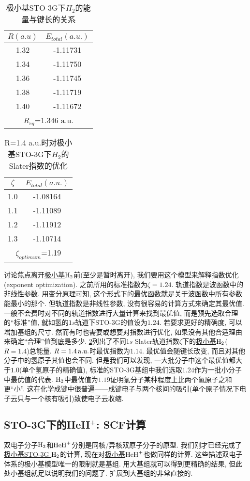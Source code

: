 \begin{table}[H]
	\centering
	\caption{极小基STO-3G下$H_2$的能量与键长的关系}
	\begin{tabular}{cc}
		\hline
		$R(a.u)$ & $E_{total}(a.u.)$\\\hline
		1.32      & -1.11731\\
		1.34     & -1.11750\\
		1.36     & -1.11745\\
		1.38     & -1.11719\\
		1.40     & -1.11672\\\hline
		\multicolumn{2}{c}{$R_{eq}$=1.346 a.u.}
	\end{tabular}
	\label{t3.2}
\end{table}
\begin{table}[H]
	\centering
	\caption{R=1.4 a.u.时对极小基STO-3G下$H_2$的Slater指数的优化}
	\begin{tabular}{cc}
		\hline
		$\zeta$ & $E_{total}(a.u.)$\\\hline
		1.0      & -1.08164\\
		1.1     & -1.11089\\
		1.2     & -1.11912\\
		1.3     & -1.10714\\\hline
		\multicolumn{2}{c}{$\zeta_{optimum}$=1.19}
	\end{tabular}
	\label{t3.3}
\end{table}
讨论焦点离开\underline{极小基$\mathrm{H}_2$}前(至少是暂时离开), 
我们要用这个模型来解释指数优化(exponent optimization). 
之前所用的标准指数为$\zeta=1.24$. 
轨道指数是波函数中的非线性参数. 
用变分原理可知, 
这个形式下的最优函数就是关于波函数中所有参数能最小的那个. 
但轨道指数是非线性参数, 
没有很容易的计算方式来确定其最优值. 
一般不会费时对不同的轨道指数进行大量计算来找到最优值, 
而是预先选取合理的``标准''值, 
就如氢的$1s$轨道下STO-3G的值设为$1.24$. 
若要求更好的精确度, 
可以增加基组的尺寸. 
然而有时也需要或想要对指数进行优化, 
如果没有其他合适理由来确定``合理''值到底是多少. 
\ref{t3.3}列出了不同$1s$ Slater轨道指数$\zeta$下的\underline{极小基$\mathrm{H}_2$}($R=1.4$)总能量. 
$R=1.4\,\mathrm{a.u.}$时最优指数为$1.14$. 
最优值会随键长改变, 
而且对其他分子中的氢原子其值也会不同. 
但是我们可以发现, 
一大批分子中这个最优值都大于$1.0$(单个氢原子的精确值), 
标准的STO-3G基组中我们选取$1.24$作为一批小分子中最优值的代表. 
$\mathrm{H}_2$中最优值为$1.19$证明氢分子某种程度上比两个氢原子之和更``小”. 
这在化学成键中很普遍——成键电子与两个核间的吸引(单个原子情况下电子云只与一个核有吸引)致使电子云收缩. 

\subsection{STO-3G下的HeH$^+$: SCF计算}
双电子分子$\mathrm{H}_2$和$\mathrm{HeH}^+$分别是同核/异核双原子分子的原型. 
我们刚才已经完成了\underline{极小基STO-3G $\mathrm{H}_2$}的计算, 
现在对\underline{极小基$\mathrm{HeH}^+$}也做同样的计算. 
这些描述双电子体系的极小基模型唯一的限制就是基组. 
用大基组就可以得到更精确的结果, 
但此处小基组就足以说明我们的问题了. 
扩展到大基组的非常直接的. 


